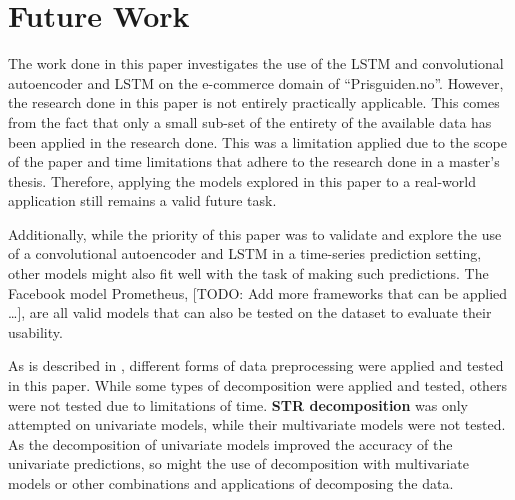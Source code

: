
\section{Future Work}
\label{sections:Discussion:FutureWork}


The work done in this paper investigates the use of the LSTM and convolutional autoencoder and LSTM
on the e-commerce domain of ``Prisguiden.no''.
However, the research done in this paper is not entirely practically applicable.
This comes from the fact that only a small sub-set of the entirety of the available data has been applied
in the research done.
This was a limitation applied due to the scope of the paper and time limitations that adhere to the research done in a master's thesis.
Therefore, applying the models explored in this paper to a real-world application still remains a valid future task.

Additionally, while the priority of this paper was to validate and explore the use of a convolutional autoencoder and LSTM
in a time-series prediction setting, other models might also fit well with the task of making such predictions.
The Facebook model Prometheus, [TODO: Add more frameworks that can be applied \dots ],
are all valid models that can also be tested on the dataset to evaluate their usability.


As is described in , different forms of data preprocessing were applied and tested in this paper.
While some types of decomposition were applied and tested, others were not tested due to limitations of time.
\textbf{STR decomposition} was only attempted on univariate models, while their multivariate models were not tested.
As the decomposition of univariate models improved the accuracy of the univariate predictions,
so might the use of decomposition with multivariate models or other combinations and applications of decomposing the data.


